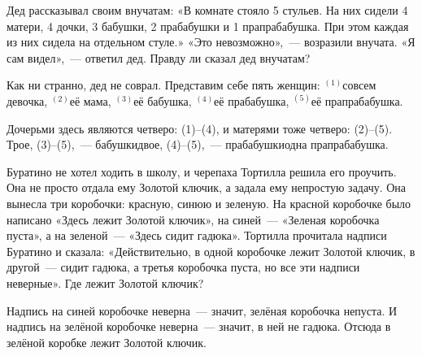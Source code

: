 \begin{itemize}

\itA Дед рассказывал своим внучатам: «В комнате стояло 5 стульев. На них сидели 4 матери, 4 дочки, 3 бабушки, 2 прабабушки и 1 прапрабабушка. При этом каждая из них сидела на отдельном стуле.» «Это невозможно»,~— возразили внучата. «Я сам видел»,~— ответил дед. Правду ли сказал дед внучатам?

\def\upno#1{$ ^{(\text{#1})}$}
\itr Как ни странно, дед не соврал. Представим себе пять женщин: \upno{1}совсем девочка, \upno{2}её мама, \upno{3}её бабушка, \upno{4}её прабабушка, \upno{5}её прапрабабушка.

Дочерьми здесь являются четверо: (1)–(4), и матерями тоже четверо: (2)–(5). Трое, (3)–(5),~— бабушки\scolon двое, (4)–(5),~— прабабушки\scolon одна прапрабабушка.

\itC Буратино не хотел ходить в школу, и черепаха Тортилла решила его проучить. Она не просто отдала ему Золотой ключик, а задала ему непростую задачу. Она вынесла три коробочки: красную, синюю и зеленую. На красной коробочке было написано «Здесь лежит Золотой ключик», на синей~— «Зеленая коробочка пуста», а на зеленой~— «Здесь сидит гадюка». Тортилла прочитала надписи Буратино и сказала: «Действительно, в одной коробочке лежит Золотой ключик, в другой~— сидит гадюка, а третья коробочка пуста, но все эти надписи неверные». Где лежит Золотой ключик?

\itr Надпись на синей коробочке неверна~— значит, зелёная коробочка непуста. И надпись на зелёной коробочке неверна~— значит, в ней не гадюка. Отсюда в зелёной коробке лежит Золотой ключик.

\end{itemize}